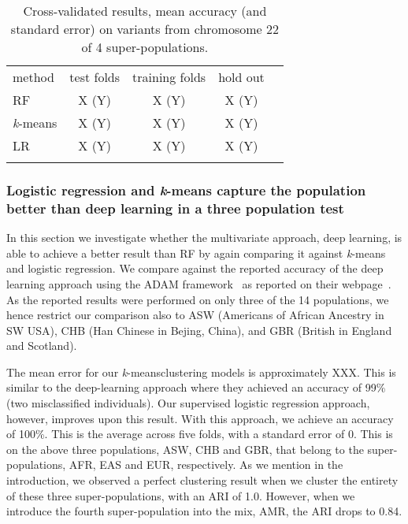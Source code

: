 \documentclass{llncs}
\newcommand{\kMeans}{\textit{k}-means}
\begin{document}
{\begin{table}
\caption{Cross-validated results, mean accuracy (and standard error) on variants from chromosome 22 of 4 super-populations.}
\begin{center}
\renewcommand{\arraystretch}{1.4}
\setlength\tabcolsep{3pt}
\begin{tabular}{lcccc}
\hline\noalign{\smallskip}
method  & test folds & training folds & hold out \\
RF  & X (Y) & X (Y) & X (Y) \\
\kMeans & X (Y) & X (Y) & X (Y) \\
LR & X (Y) & X (Y) & X (Y) \\
\noalign{\smallskip}
\hline
\label{RF}
\end{tabular}
\end{center}
\end{table}




\subsubsection{Logistic regression and \kMeans{} capture the population better than deep learning in a three population test}
In this section we investigate whether the multivariate approach, deep learning, is able to achieve a better result than RF by again comparing it against \kMeans{} and logistic regression.  
We compare against the reported accuracy of the deep learning approach using the {\sc ADAM} framework~\cite{Massie2013} as reported on their webpage~\cite{Ferguson}. 
As the reported results were performed on only three of the 14 populations, we hence restrict our comparison also to ASW (Americans of African Ancestry in SW USA), CHB (Han Chinese in Bejing, China), and GBR (British in England and Scotland).

The mean error for our \kMeans clustering models is approximately XXX. This is similar to the deep-learning approach where they achieved an accuracy of 99\% (two misclassified individuals). Our supervised logistic regression approach, however, improves upon this result.
With this approach, we achieve an accuracy of 100\%. This is the average across five folds, with a standard error of 0. This is on the above three populations, ASW, CHB and GBR, that belong to the super-populations, AFR, EAS and EUR, respectively.
As we mention in the introduction, we observed a perfect clustering result when we cluster the entirety of these three super-populations, with an ARI of 1.0. However, when we introduce the fourth super-population into the mix, AMR, the ARI drops to 0.84.


}
\end{document}
